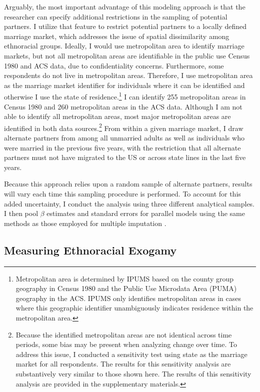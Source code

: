 \documentclass[11pt,]{article}
\begin{document}
Arguably, the most important advantage of this modeling approach is that the researcher can specify additional restrictions in the sampling of potential partners. I utilize that feature to restrict potential partners to a locally defined marriage market, which addresses the issue of spatial dissimilarity among ethnoracial groups. Ideally, I would use metropolitan area to identify marriage markets, but not all metropolitan areas are identifiable in the public use Census 1980 and ACS data, due to confidentiality concerns. Furthermore, some respondents do not live in metropolitan areas. Therefore, I use metropolitan area as the marriage market identifier for individuals where it can be identified and otherwise I use the state of residence.\footnote{Metropolitan area is determined by IPUMS based on the county group geography in Census 1980 and the Public Use Microdata Area (PUMA) geography in the ACS. IPUMS only identifies metropolitan areas in cases where this geographic identifier unambiguously indicates residence within the metropolitan area.} I can identify 255 metropolitan areas in Census 1980 and 260 metropolitan areas in the ACS data. Although I am not able to identify all metropolitan areas, most major metropolitan areas are identified in both data sources.\footnote{Because the identified metropolitan areas are not identical across time periods, some bias may be present when analyzing change over time. To address this issue, I conducted a sensitivity test using state as the marriage market for all respondents. The results for this sensitivity analysis are substantively very similar to those shown here. The results of this sensitivity analysis are provided in the supplementary materials.} From within a given marriage market, I draw alternate partners from among all unmarried adults as well as individuals who were married in the previous five years, with the restriction that all alternate partners must not have migrated to the US or across state lines in the last five years.

Because this approach relies upon a random sample of alternate partners, results will vary each time this sampling procedure is performed. To account for this added uncertainty, I conduct the analysis using three different analytical samples. I then pool \(\beta\) estimates and standard errors for parallel models using the same methods as those employed for multiple imputation \citep{rubin_multiple_1987, gullickson_counterfactual_2021}.

\hypertarget{measuring-ethnoracial-exogamy}{%
\subsection{Measuring Ethnoracial Exogamy}\label{measuring-ethnoracial-exogamy}}
\end{document}
